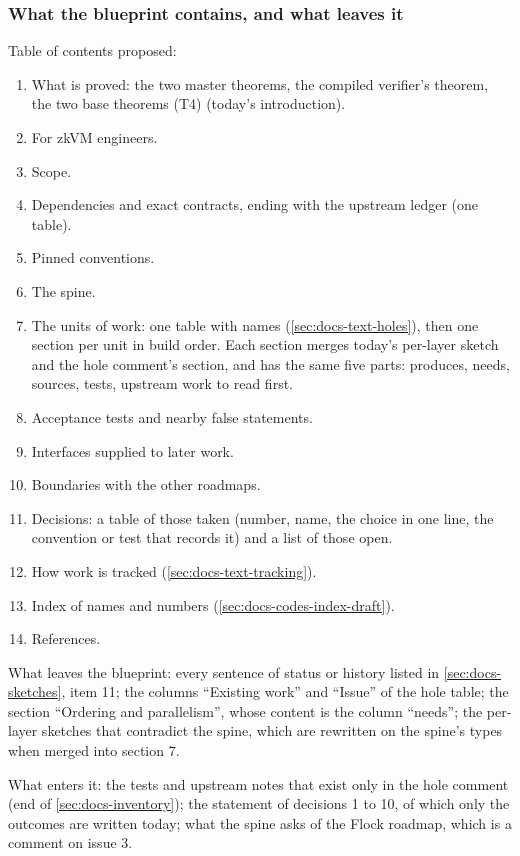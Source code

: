 \subsubsection{What the blueprint contains, and what leaves it}\label{sec:docs-blueprint-contents}

Table of contents proposed:

\begin{enumerate}
\item What is proved: the two master theorems, the compiled verifier's theorem, the two base theorems (T4) (today's introduction).
\item For zkVM engineers.
\item Scope.
\item Dependencies and exact contracts, ending with the upstream ledger (one table).
\item Pinned conventions.
\item The spine.
\item The units of work: one table with names (\cref{sec:docs-text-holes}), then one section per unit in build order. Each section merges today's per-layer sketch and the hole comment's section, and has the same five parts: produces, needs, sources, tests, upstream work to read first.
\item Acceptance tests and nearby false statements.
\item Interfaces supplied to later work.
\item Boundaries with the other roadmaps.
\item Decisions: a table of those taken (number, name, the choice in one line, the convention or test that records it) and a list of those open.
\item How work is tracked (\cref{sec:docs-text-tracking}).
\item Index of names and numbers (\cref{sec:docs-codes-index-draft}).
\item References.
\end{enumerate}

What leaves the blueprint: every sentence of status or history listed in \cref{sec:docs-sketches}, item 11; the columns ``Existing work'' and ``Issue'' of the hole table; the section ``Ordering and parallelism'', whose content is the column ``needs''; the per-layer sketches that contradict the spine, which are rewritten on the spine's types when merged into section 7.

What enters it: the tests and upstream notes that exist only in the hole comment (end of \cref{sec:docs-inventory}); the statement of decisions 1 to 10, of which only the outcomes are written today; what the spine asks of the Flock roadmap, which is a comment on issue 3.

